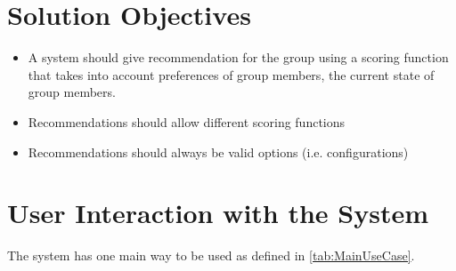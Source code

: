 \documentclass{article}
\begin{document}
\section{Solution Objectives}

\begin{itemize}
    \item A system should give recommendation for the group using a scoring function that takes into account preferences of group members, the current state of group members.
    \item Recommendations should allow different scoring functions
    \item Recommendations should always be valid options (i.e. configurations)
\end{itemize}

\section{User Interaction with the System}
The system has one main way to be used as defined in \autoref{tab:MainUseCase}.
\end{document}
